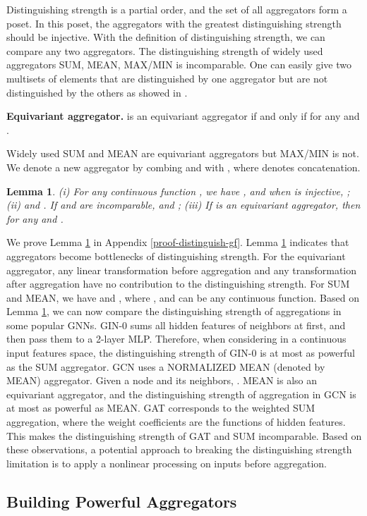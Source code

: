 \documentclass{article} \usepackage{iclr2021_conference,times}
\newtheorem{lemma}{Lemma}
\begin{document}
Distinguishing strength is a partial order,
and the set of all aggregators form a poset.
In this poset, the aggregators with the greatest distinguishing strength should be injective.
With the definition of distinguishing strength, we can compare any two aggregators.
The distinguishing strength of widely used aggregators SUM, MEAN, MAX/MIN is incomparable.
One can easily give two multisets of elements that are distinguished by one aggregator but are not distinguished by the others as showed in \citep{corso2020principal}.

\textbf{Equivariant aggregator.}
 is an equivariant aggregator if and only if 
for any  and .

Widely used SUM and MEAN are equivariant aggregators but MAX/MIN is not.
We denote  a new aggregator by combing  and  with , where  denotes concatenation.
\begin{lemma}
(i) For any continuous function , we have , and when  is injective, ;
(ii)  and . If  and  are incomparable,  and ;
(iii) If  is an equivariant aggregator, then  for any  and .
\label{distinguish-gf}
\end{lemma}
We prove Lemma \ref{distinguish-gf} in Appendix \ref{proof-distinguish-gf}. 
Lemma \ref{distinguish-gf} indicates that aggregators become bottlenecks of distinguishing strength.
For the equivariant aggregator, any linear transformation before aggregation and any transformation after aggregation have no contribution to the distinguishing strength.
For SUM and MEAN,
we have 
 and
,
where , and  can be any continuous function.
Based on Lemma \ref{distinguish-gf},
we can now compare the distinguishing strength of aggregations in some popular GNNs.
GIN-0 sums all hidden features of neighbors at first, and then pass them to a 2-layer MLP.
Therefore,
when considering in a continuous input features space,
the distinguishing strength of GIN-0 is at most as powerful as the SUM aggregator.
GCN uses a NORMALIZED MEAN (denoted by MEAN) aggregator.
Given a node  and its neighbors,
.
MEAN is also an equivariant aggregator,
and the distinguishing strength of aggregation in GCN is at most as powerful as MEAN.
GAT corresponds to the weighted SUM aggregation,
where the weight coefficients are the functions of hidden features.
This makes the distinguishing strength of GAT and SUM incomparable.
Based on these observations,
a potential approach to breaking the distinguishing strength limitation is to apply a nonlinear processing on inputs before aggregation.


\subsection{Building Powerful Aggregators}
\label{nwf-analyze}
\end{document}
